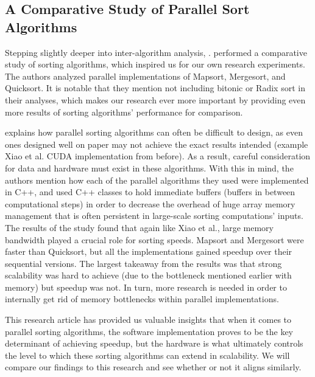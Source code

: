 \documentclass[11pt,twocolumn]{article}
\begin{document}
\subsection{A Comparative Study of Parallel Sort Algorithms}
Stepping slightly deeper into inter-algorithm analysis, \cite{Pasetto}. performed a comparative study of sorting algorithms, which inspired us for our own research experiments. The authors analyzed parallel implementations of Mapsort, Mergesort, and Quicksort. It is notable that they mention not including bitonic or Radix sort in their analyses, which makes our research ever more important by providing even more results of sorting algorithms' performance for comparison.

\cite{Pasetto} explains how parallel sorting algorithms can often be difficult to design, as even ones designed well on paper may not achieve the exact results intended (example Xiao et al. CUDA implementation from before). As a result, careful consideration for data and hardware must exist in these algorithms. With this in mind, the authors mention how each of the parallel algorithms they used were implemented in C++, and used C++ classes to hold immediate buffers (buffers in between computational steps) in order to decrease the overhead of huge array memory management that is often persistent in large-scale sorting computations' inputs. The results of the study found that again like Xiao et al., large memory bandwidth played a crucial role for sorting speeds. Mapsort and Mergesort were faster than Quicksort, but all the implementations gained speedup over their sequential versions. The largest takeaway from the results was that strong scalability was hard to achieve (due to the bottleneck mentioned earlier with memory) but speedup was not. In turn, more research is needed in order to internally get rid of memory bottlenecks within parallel implementations.

This research article has provided us valuable insights that when it comes to parallel sorting algorithms, the software implementation proves to be the key determinant of achieving speedup, but the hardware is what ultimately controls the level to which these sorting algorithms can extend in scalability. We will compare our findings to this research and see whether or not it aligns similarly.



\end{document}
